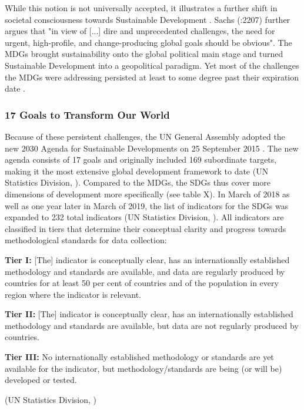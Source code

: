 		        \medskip
		        
		        While this notion is not universally accepted, it illustrates a further shift in societal consciousness towards Sustainable Development \citep{heikkurinen2019}. Sachs (\citeyear{sachs2012}:2207) further argues that "in view of [...] dire and unprecedented challenges, the need for urgent, high-profile, and change-producing global goals should be obvious". The MDGs brought sustainability onto the global political main stage and turned Sustainable Development into a geopolitical paradigm. Yet most of the challenges the MDGs were addressing persisted at least to some degree past their expiration date \citep{sachs2012}.
		        

		    \subsubsection{17 Goals to Transform Our World}
	            
	            Because of these persistent challenges, the UN General Assembly adopted the new 2030 Agenda for Sustainable Developments on 25 September 2015 \citep{unitednations2018}. The new agenda consists of 17 goals and originally included 169 subordinate targets, making it the most extensive global development framework to date (UN Statistics Division, \citeyear{unitednationsstatisticsdivision2019a}). Compared to the MDGs, the SDGs thus cover more dimensions of development more specifically (see table X). In March of 2018 as well as one year later in March of 2019, the list of indicators for the SDGs was expanded to 232 total indicators (UN Statistics Division, \citeyear{unitednationsstatisticsdivision2019}). All indicators are classified in tiers that determine their conceptual clarity and progress towards methodological standards for data collection:
	            
	            \medskip
	            
	            \begin{tcolorbox}
    				\textbf{Tier I:} [The] indicator is conceptually clear, has an internationally established methodology and standards are available, and data are regularly produced by countries for at least 50 per cent of countries and of the population in every region where the indicator is relevant.
    				\medskip
    				
    				\textbf{Tier II:} [The] indicator is conceptually clear, has an internationally established methodology and standards are available, but data are not regularly produced by countries.
    				\medskip
    				
    				\textbf{Tier III:} No internationally established methodology or standards are yet available for the indicator, but methodology/standards are being (or will be) developed or tested.
    				
    				\begin{center}
    				    (UN Statistics Division, \citeyear{unitednationsstatisticsdivision2019b})
    				\end{center}
			    \end{tcolorbox}

